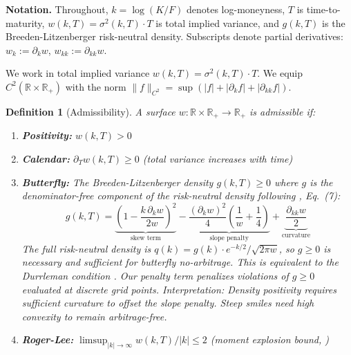 \documentclass[11pt,a4paper]{article}
\newtheorem{definition}[theorem]{Definition}
\newcommand{\R}{\mathbb{R}}
\newcommand{\maturity}{T}
\newcommand{\logstrike}{k}
\newcommand{\totalvar}{w}
\newcommand{\density}{g}
\newcommand{\abs}[1]{\left| #1 \right|}
\begin{document}
\textbf{Notation.} Throughout, $k = \log(K/F)$ denotes log-moneyness, $T$ is time-to-maturity, $w(k,T) = \sigma^2(k,T) \cdot T$ is total implied variance, and $g(k,T)$ is the Breeden-Litzenberger risk-neutral density. Subscripts denote partial derivatives: $w_k := \partial_k w$, $w_{kk} := \partial_{kk} w$.

We work in total implied variance $w(k, T) = \sigma^2(k, T) \cdot T$. We equip $C^2(\R \times \R_+)$ with the norm $\|f\|_{C^2} = \sup(|f| + |\partial_k f| + |\partial_{kk} f|)$.

\begin{definition}[Admissibility]
\label{def:admissibility}
A surface $\totalvar: \R \times \R_+ \to \R_+$ is \textit{admissible} if:
\begin{enumerate}[label=(A\arabic*)]
    \item \textbf{Positivity:} $\totalvar(\logstrike, \maturity) > 0$
    \item \textbf{Calendar:} $\partial_\maturity \totalvar(\logstrike, \maturity) \geq 0$ \quad (total variance increases with time)
    \item \textbf{Butterfly:} The Breeden-Litzenberger density $\density(\logstrike, \maturity) \geq 0$ where $\density$ is the denominator-free component of the risk-neutral density following \citet{gatheral2014}, Eq.~(7):
    \begin{equation}
        \density(\logstrike, \maturity) = \underbrace{\left(1 - \frac{\logstrike \, \partial_\logstrike \totalvar}{2\totalvar}\right)^2}_{\text{skew term}} - \underbrace{\frac{(\partial_\logstrike \totalvar)^2}{4}\left(\frac{1}{\totalvar} + \frac{1}{4}\right)}_{\text{slope penalty}} + \underbrace{\frac{\partial_{\logstrike\logstrike} \totalvar}{2}}_{\text{curvature}}
        \label{eq:density}
    \end{equation}
    The full risk-neutral density is $q(\logstrike) = \density(\logstrike) \cdot e^{-\logstrike/2} / \sqrt{2\pi \totalvar}$, so $\density \geq 0$ is necessary and sufficient for butterfly no-arbitrage. This is equivalent to the Durrleman condition \citep{durrleman2004}. Our penalty term penalizes violations of $\density \geq 0$ evaluated at discrete grid points.
    \textit{Interpretation:} Density positivity requires sufficient curvature to offset the slope penalty. Steep smiles need high convexity to remain arbitrage-free.
    \item \textbf{Roger-Lee:} $\limsup_{\abs{\logstrike} \to \infty} \totalvar(\logstrike, \maturity)/\abs{\logstrike} \leq 2$ \quad (moment explosion bound, \citet{lee2004})
\end{enumerate}
\end{definition}
\end{document}
